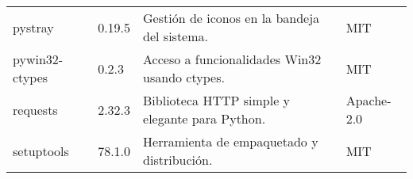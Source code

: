 \begin{longtable}[]{@{}llll@{}}
    \begin{minipage}[t]{0.18\columnwidth}\raggedright\strut pystray \strut \end{minipage} & \begin{minipage}[t]{0.10\columnwidth}\raggedright\strut 0.19.5 \strut \end{minipage} & \begin{minipage}[t]{0.49\columnwidth}\raggedright\strut Gestión de iconos en la bandeja del sistema. \strut \end{minipage} & \begin{minipage}[t]{0.11\columnwidth}\raggedright\strut MIT \strut \end{minipage} \tabularnewline

    \begin{minipage}[t]{0.18\columnwidth}\raggedright\strut pywin32-ctypes \strut \end{minipage} & \begin{minipage}[t]{0.10\columnwidth}\raggedright\strut 0.2.3 \strut \end{minipage} & \begin{minipage}[t]{0.49\columnwidth}\raggedright\strut Acceso a funcionalidades Win32 usando ctypes. \strut \end{minipage} & \begin{minipage}[t]{0.11\columnwidth}\raggedright\strut MIT \strut \end{minipage} \tabularnewline

    \begin{minipage}[t]{0.18\columnwidth}\raggedright\strut requests \strut \end{minipage} & \begin{minipage}[t]{0.10\columnwidth}\raggedright\strut 2.32.3 \strut \end{minipage} & \begin{minipage}[t]{0.49\columnwidth}\raggedright\strut Biblioteca HTTP simple y elegante para Python. \strut \end{minipage} & \begin{minipage}[t]{0.11\columnwidth}\raggedright\strut Apache-2.0 \strut \end{minipage} \tabularnewline

    \begin{minipage}[t]{0.18\columnwidth}\raggedright\strut setuptools \strut \end{minipage} & \begin{minipage}[t]{0.10\columnwidth}\raggedright\strut 78.1.0 \strut \end{minipage} & \begin{minipage}[t]{0.49\columnwidth}\raggedright\strut Herramienta de empaquetado y distribución. \strut \end{minipage} & \begin{minipage}[t]{0.11\columnwidth}\raggedright\strut MIT \strut \end{minipage} \tabularnewline


\end{longtable}
